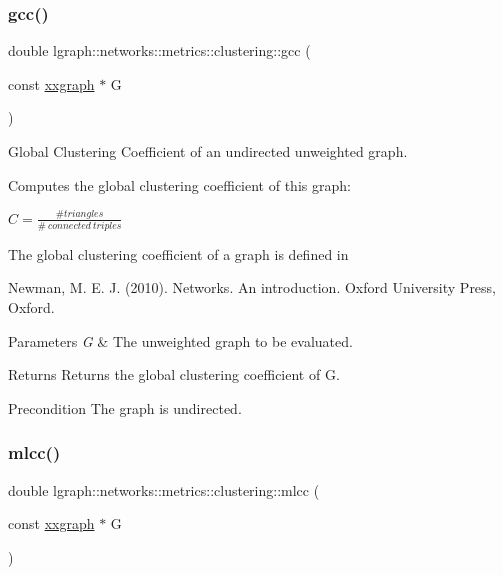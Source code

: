 \subsubsection{\texorpdfstring{gcc()}{gcc()}}
{\footnotesize\ttfamily double lgraph\+::networks\+::metrics\+::clustering\+::gcc (\begin{DoxyParamCaption}\item[{const \hyperlink{classlgraph_1_1xxgraph}{xxgraph} $\ast$}]{G }\end{DoxyParamCaption})}



Global Clustering Coefficient of an undirected unweighted graph. 

Computes the global clustering coefficient of this graph\+:

$C = \frac{\# triangles}{\# \ connected \ triples}$

The global clustering coefficient of a graph is defined in \begin{DoxyVerb}Newman, M. E. J. (2010). Networks. An introduction. Oxford
University Press, Oxford.
\end{DoxyVerb}



\begin{DoxyParams}{Parameters}
{\em G} & The unweighted graph to be evaluated. \\
\hline
\end{DoxyParams}
\begin{DoxyReturn}{Returns}
Returns the global clustering coefficient of G. 
\end{DoxyReturn}
\begin{DoxyPrecond}{Precondition}
The graph is undirected. 
\end{DoxyPrecond}
\mbox{\label{namespacelgraph_1_1networks_1_1metrics_1_1clustering_a489c3b47b7b69eeabacbea5248dc41e4}} 
\subsubsection{\texorpdfstring{mlcc()}{mlcc()}}
{\footnotesize\ttfamily double lgraph\+::networks\+::metrics\+::clustering\+::mlcc (\begin{DoxyParamCaption}\item[{const \hyperlink{classlgraph_1_1xxgraph}{xxgraph} $\ast$}]{G }\end{DoxyParamCaption})}



